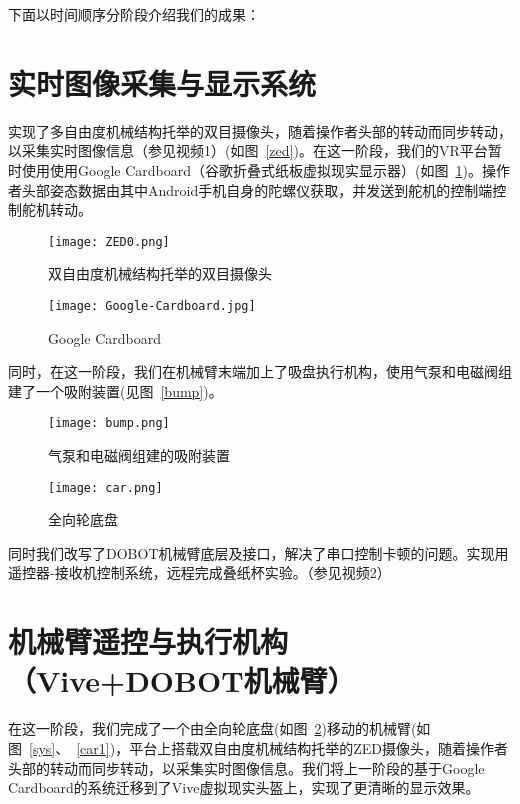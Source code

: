下面以时间顺序分阶段介绍我们的成果：

\section{实时图像采集与显示系统}
实现了多自由度机械结构托举的双目摄像头，随着操作者头部的转动而同步转动，以采集实时图像信息{\kaishu （参见视频1）}(如图~\ref{zed})。在这一阶段，我们的VR平台暂时使用使用Google Cardboard（谷歌折叠式纸板虚拟现实显示器）(如图~\ref{card})。操作者头部姿态数据由其中Android手机自身的陀螺仪获取，并发送到舵机的控制端控制舵机转动。

\begin{figure}
\begin{minipage}{0.48\textwidth}
  \centering
  \texttt{[image: ZED0.png]}
  \caption{双自由度机械结构托举的双目摄像头}
  \label{zed}
\end{minipage}\hfill
\begin{minipage}{0.48\textwidth}
  \centering
  \texttt{[image: Google-Cardboard.jpg]}
  \caption{Google Cardboard}
  \label{card}
\end{minipage}
\end{figure}

同时，在这一阶段，我们在机械臂末端加上了吸盘执行机构，使用气泵和电磁阀组建了一个吸附装置(见图~\ref{bump})。

\begin{figure}
\begin{minipage}{0.48\textwidth}
  \centering
  \texttt{[image: bump.png]}
  \caption{气泵和电磁阀组建的吸附装置}
  \label{bump}
\end{minipage}
\begin{minipage}{0.48\textwidth}
  \centering
  \texttt{[image: car.png]}
  \caption{全向轮底盘}
  \label{car}
\end{minipage}\hfill
\end{figure}


同时我们改写了DOBOT机械臂底层及接口，解决了串口控制卡顿的问题。实现用遥控器-接收机控制系统，远程完成叠纸杯实验。{\kaishu （参见视频2）}

\section{机械臂遥控与执行机构（Vive+DOBOT机械臂）}

在这一阶段，我们完成了一个由全向轮底盘(如图~\ref{car})移动的机械臂(如图~\ref{sys}、~\ref{car1})，平台上搭载双自由度机械结构托举的ZED摄像头，随着操作者头部的转动而同步转动，以采集实时图像信息。我们将上一阶段的基于Google Cardboard的系统迁移到了Vive虚拟现实头盔上，实现了更清晰的显示效果。


